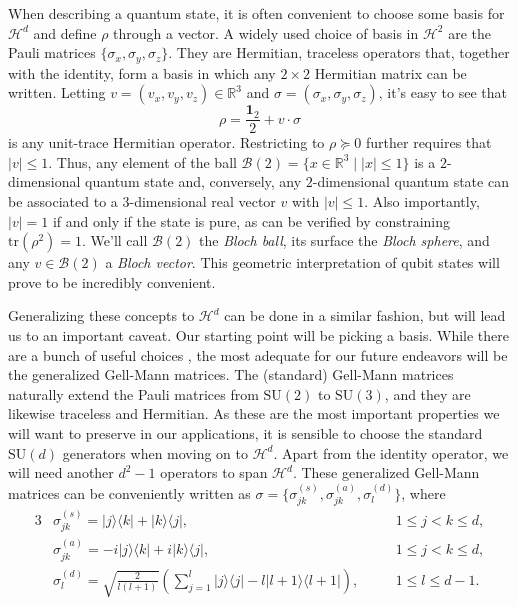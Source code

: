 		When describing a quantum state, it is often convenient to choose some basis for $\mathcal{H}^d$ and define $\rho$ through a vector. A widely used choice of basis in $\mathcal{H}^2$ are the Pauli matrices $\{\sigma_x, \sigma_y, \sigma_z\}$. They are Hermitian, traceless operators that, together with the identity, form a basis in which any $2 \times 2$ Hermitian matrix can be written. Letting $v = (v_x, v_y, v_z) \in \mathbb{R}^3$ and $\sigma = (\sigma_x, \sigma_y, \sigma_z)$, it's easy to see that
		$$
			\rho = \frac{\mathbf{1}_2}{2} + v \cdot \sigma
		$$
		is any unit-trace Hermitian operator. Restricting to $\rho \succeq 0$ further requires that $\lvert v \rvert \leq 1$. Thus, any element of the ball $\mathcal{B}(2) = \{ x \in \mathbb{R}^3 \mid \lvert x \vert \leq 1 \}$ is a $2$-dimensional quantum state and, conversely, any $2$-dimensional quantum state can be associated to a $3$-dimensional real vector $v$ with $\lvert v \rvert \leq 1$. Also importantly, $\lvert v \rvert = 1$ if and only if the state is pure, as can be verified by constraining $\text{tr}(\rho^2) = 1$. We'll call $\mathcal{B}(2)$ the \emph{Bloch ball}, its surface the \emph{Bloch sphere}, and any $v \in \mathcal{B}(2)$ a \emph{Bloch vector}. This geometric interpretation of qubit states will prove to be incredibly convenient.

		Generalizing these concepts to $\mathcal{H}^d$ can be done in a similar fashion, but will lead us to an important caveat. Our starting point will be picking a basis. While there are a bunch of useful choices \cite{bertlmann_2008_bloch}, the most adequate for our future endeavors will be the generalized Gell-Mann matrices. The (standard) Gell-Mann matrices naturally extend the Pauli matrices from $\text{SU}(2)$ to $\text{SU}(3)$, and they are likewise traceless and Hermitian. As these are the most important properties we will want to preserve in our applications, it is sensible to choose the standard $\text{SU}(d)$ generators when moving on to $\mathcal{H}^d$. Apart from the identity operator, we will need another $d^2 - 1$ operators to span $\mathcal{H}^d$. These generalized Gell-Mann matrices can be conveniently written as $\sigma = \{ \sigma^{(s)}_{jk}, \sigma^{(a)}_{jk}, \sigma^{(d)}_l \}$, where
		\begin{alignat*}{3}
			&\sigma^{(s)}_{jk} = \lvert j \rangle \langle k \rvert + \lvert k \rangle \langle j \rvert, \quad &&1 \leq j < k \leq d, \\
			&\sigma^{(a)}_{jk} = -i\lvert j \rangle \langle k \rvert + i\lvert k \rangle \langle j \rvert, \quad &&1 \leq j < k \leq d, \\
			&\sigma^{(d)}_{l} = \sqrt{\frac{2}{l (l+1)}} \left( \sum_{j=1}^l \lvert j \rangle \langle j \rvert - l\lvert l + 1 \rangle \langle l + 1 \rvert \right), \quad &&1 \leq l \leq d - 1 .
		\end{alignat*}

